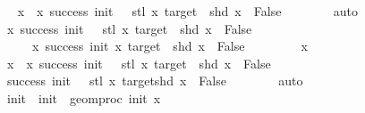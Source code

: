 \begin{isabellebody}
\ \isamarkupfalse%
\ {\isachardoublequoteopen}x\ {\isasymin}\ {\isacharbraceleft}{\kern0pt}x{\isachardot}{\kern0pt}\ success\ {\isacharparenleft}{\kern0pt}init\ {\isacharminus}{\kern0pt}\ {}{\isacharparenright}{\kern0pt}\ {\isacharparenleft}{\kern0pt}stl\ x{\isacharparenright}{\kern0pt}\ target\ {\isasymand}\ shd\ x\ {\isacharequal}{\kern0pt}\ False{\isacharbraceright}{\kern0pt}{\isachardoublequoteclose}\isanewline
\ \ \ \ \ \ \isamarkupfalse%
\ auto\isanewline
\ \ \isamarkupfalse%
\isanewline
{}\isamarkupfalse%
\ \isanewline
\ \ \isamarkupfalse%
\ {\isachardoublequoteopen}{\isacharbraceleft}{\kern0pt}x{\isachardot}{\kern0pt}\ success\ {\isacharparenleft}{\kern0pt}init\ {\isacharminus}{\kern0pt}\ {}{\isacharparenright}{\kern0pt}\ {\isacharparenleft}{\kern0pt}stl\ x{\isacharparenright}{\kern0pt}\ target\ {\isasymand}\ shd\ x\ {\isacharequal}{\kern0pt}\ False{\isacharbraceright}{\kern0pt}\isanewline
\ \ \ \ {\isasymsubseteq}\ {\isacharbraceleft}{\kern0pt}x{\isachardot}{\kern0pt}\ success\ init\ x\ target\ {\isasymand}\ shd\ x\ {\isacharequal}{\kern0pt}\ False{\isacharbraceright}{\kern0pt}{\isachardoublequoteclose}\isanewline
\ \ \isamarkupfalse%
\isanewline
\ \ \ \ \isamarkupfalse%
\ x\isanewline
\ \ \ \ \isamarkupfalse%
\ {\isachardoublequoteopen}x\ {\isasymin}\ {\isacharbraceleft}{\kern0pt}x{\isachardot}{\kern0pt}\ success\ {\isacharparenleft}{\kern0pt}init\ {\isacharminus}{\kern0pt}\ {}{\isacharparenright}{\kern0pt}\ {\isacharparenleft}{\kern0pt}stl\ x{\isacharparenright}{\kern0pt}\ target\ {\isasymand}\ shd\ x\ {\isacharequal}{\kern0pt}\ False{\isacharbraceright}{\kern0pt}{\isachardoublequoteclose}\isanewline
\ \ \ \ \isamarkupfalse%
\ \isamarkupfalse%
\ {\isachardoublequoteopen}success\ {\isacharparenleft}{\kern0pt}init\ {\isacharminus}{\kern0pt}\ {}{\isacharparenright}{\kern0pt}\ {\isacharparenleft}{\kern0pt}stl\ x{\isacharparenright}{\kern0pt}\ target{\isachardoublequoteclose}{\isachardoublequoteopen}shd\ x\ {\isacharequal}{\kern0pt}\ False{\isachardoublequoteclose}\isanewline
\ \ \ \ \ \ \isamarkupfalse%
\ auto\isanewline
\ \ \ \ \isamarkupfalse%
\ init{\isacharprime}{\kern0pt}\ \ {\isachardoublequoteopen}init{\isacharprime}{\kern0pt}\ {\isacharequal}{\kern0pt}\ geom{\isacharunderscore}{\kern0pt}proc\ init\ x\ {}{\isachardoublequoteclose}\isanewline
\ \ \ \ \ \ \isamarkupfalse%

\end{isabellebody}
